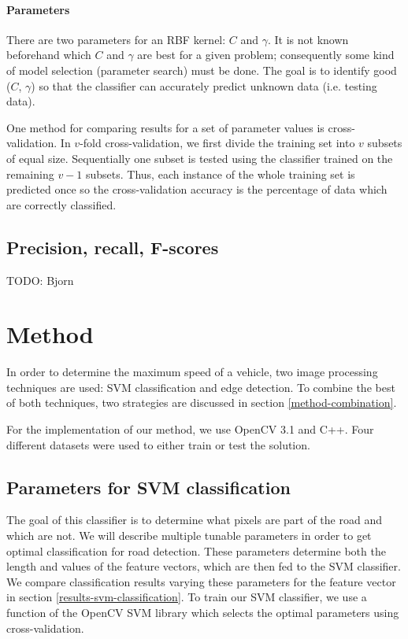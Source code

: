 \documentclass[runningheads,a4paper]{llncs}
\begin{document}
\paragraph{Parameters} There are two parameters for an RBF kernel: $C$ and $\gamma$. It is not known beforehand which $C$ and $\gamma$ are best for a given problem; consequently some kind of model selection (parameter search) must be done. The goal is to identify good ($C$, $\gamma$) so that the classifier can accurately predict unknown data (i.e. testing data).

One method for comparing results for a set of parameter values is cross-validation. In $v$-fold cross-validation, we first divide the training set into $v$ subsets of equal size. Sequentially one subset is tested using the classifier trained on the remaining $v − 1$ subsets. Thus, each instance of the whole training set is predicted once so the cross-validation accuracy is the percentage of data which are correctly classified.

\subsection{Precision, recall, F-scores}
TODO: Bjorn


\section{Method}
In order to determine the maximum speed of a vehicle, two image processing techniques are used: SVM classification and edge detection. To combine the best of both techniques, two strategies are discussed in section \ref{method-combination}.

For the implementation of our method, we use OpenCV 3.1 \cite{Bradski2000} and C++. Four different datasets were used to either train or test the solution.

\subsection{Parameters for SVM classification}\label{parameters-classification}
The goal of this classifier is to determine what pixels are part of the road and which are not. We will describe multiple tunable parameters in order to get optimal classification for road detection. These parameters determine both the length and values of the feature vectors, which are then fed to the SVM classifier. We compare classification results varying these parameters for the feature vector in section \ref{results-svm-classification}. To train our SVM classifier, we use a function of the OpenCV SVM library which selects the optimal parameters using cross-validation.
\end{document}

